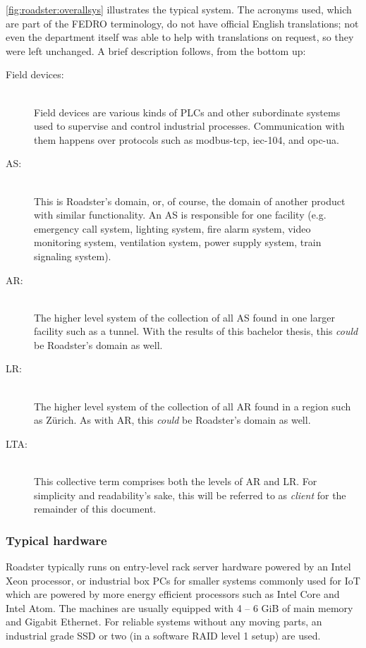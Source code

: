 \autoref{fig:roadster:overallsys} illustrates the typical system. The acronyms
used, which are part of the \gls{FEDRO} terminology, do not have official
English translations; not even the department itself was able to help with
translations on request, so they were left unchanged. A brief description
follows, from the bottom up:

\begin{description}
	\item [ Field devices: ] \hfill\\
	Field devices are various kinds of \glspl{PLC} and other subordinate systems
	used to supervise and control industrial processes. Communication with them
	happens over protocols such as \gls{modbus-tcp}, \gls{iec-104}, and
	\gls{opc-ua}.

	\item [ \gls{AS}: ] \hfill\\
	This is Roadster's domain, or, of course, the domain of another product with similar
	functionality. An AS is responsible for one facility (e.g. emergency call system,
	lighting system, fire alarm system, video monitoring system, ventilation
	system, power supply system, train signaling system).

	\item [ \gls{AR}: ] \hfill\\
	The higher level system of the collection of all AS found in one larger
	facility such as a tunnel. With the results of this bachelor thesis, this
	\emph{could} be Roadster's domain as well.

	\item [ \gls{LR}: ] \hfill\\
	The higher level system of the collection of all AR found in a region such as
	Z\"urich. As with AR, this \emph{could} be Roadster's domain as well.

	\item [ \gls{LTA}: ] \hfill\\
	This collective term comprises both the levels of AR and LR. For
	simplicity and readability's sake, this will be referred to as
	\emph{client} for the remainder of this document.
\end{description}

\subsubsection{Typical hardware}
Roadster typically runs on entry-level rack server hardware powered by an
Intel\textregistered{} Xeon\textregistered{} processor, or industrial box PCs for smaller systems
commonly used for \gls{IoT} which are powered by more energy efficient processors
such as Intel\textregistered{} Core\textregistered{} and Intel\textregistered{}
Atom\texttrademark{}. The machines are usually equipped with 4 -- 6 GiB of main
memory and Gigabit Ethernet. For reliable systems without any moving parts, an
industrial grade \gls{SSD} or two (in a software \gls{RAID} level 1 setup) are used.



